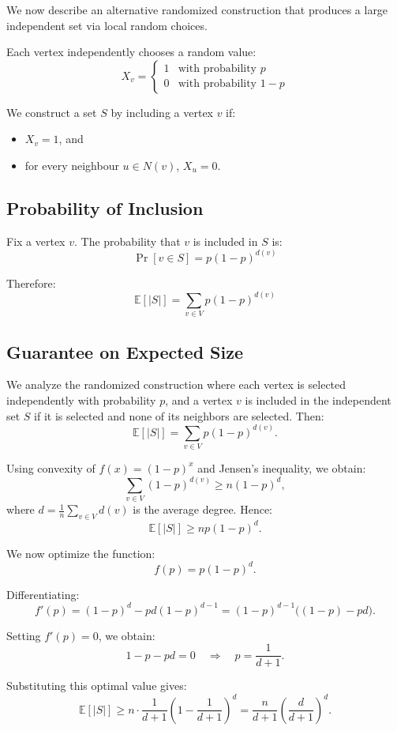 We now describe an alternative randomized construction that produces a large independent set via local random choices.

Each vertex independently chooses a random value:
\[
X_v =
\begin{cases}
1 & \text{with probability } p \\
0 & \text{with probability } 1-p
\end{cases}
\]

We construct a set \(S\) by including a vertex \(v\) if:
\begin{itemize}
    \item \(X_v = 1\), and
    \item for every neighbour \(u \in N(v)\), \(X_u = 0\).
\end{itemize}

\subsection*{Probability of Inclusion}

Fix a vertex \(v\). The probability that \(v\) is included in \(S\) is:
\[
\Pr[v \in S] = p(1-p)^{d(v)}
\]

Therefore:
\[
\mathbb{E}[|S|] = \sum_{v \in V} p(1-p)^{d(v)}
\]

\subsection*{Guarantee on Expected Size}

We analyze the randomized construction where each vertex is selected independently with probability \(p\), and a vertex \(v\) is included in the independent set \(S\) if it is selected and none of its neighbors are selected. Then:
\[
\mathbb{E}[|S|]=\sum_{v\in V} p(1-p)^{d(v)}.
\]

Using convexity of \(f(x)=(1-p)^x\) and Jensen’s inequality, we obtain:
\[
\sum_{v\in V}(1-p)^{d(v)}\ge n(1-p)^d,
\]
where \(d=\frac{1}{n}\sum_{v\in V}d(v)\) is the average degree. Hence:
\[
\mathbb{E}[|S|]\ge np(1-p)^d.
\]

We now optimize the function:
\[
f(p)=p(1-p)^d.
\]

Differentiating:
\[
f'(p)=(1-p)^d - pd(1-p)^{d-1}
=(1-p)^{d-1}\big((1-p)-pd\big).
\]

Setting \(f'(p)=0\), we obtain:
\[
1-p-pd=0
\quad\Rightarrow\quad
p=\frac{1}{d+1}.
\]

Substituting this optimal value gives:
\[
\mathbb{E}[|S|]\ge n\cdot \frac{1}{d+1}\left(1-\frac{1}{d+1}\right)^d
=\frac{n}{d+1}\left(\frac{d}{d+1}\right)^d.
\]


